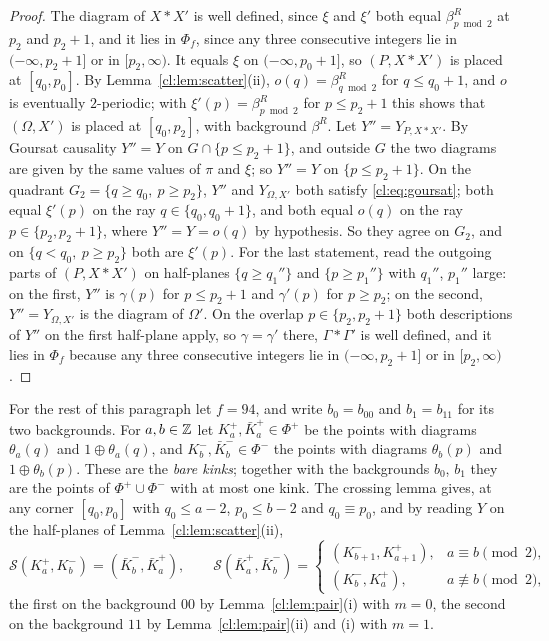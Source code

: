 \begin{proof}
The diagram of $X*X'$ is well defined, since $\xi$ and $\xi'$ both equal $\beta^R_{p\bmod2}$ at $p_2$ and $p_2+1$, and it lies in $\Phi_f$, since any three consecutive integers lie in $(-\infty,p_2+1]$ or in $[p_2,\infty)$. It equals $\xi$ on $(-\infty,p_0+1]$, so $(P,X*X')$ is placed at $[q_0,p_0]$. By Lemma~\ref{cl:lem:scatter}(ii), $o(q)=\beta^R_{q\bmod2}$ for $q\le q_0+1$, and $o$ is eventually $2$-periodic; with $\xi'(p)=\beta^R_{p\bmod2}$ for $p\le p_2+1$ this shows that $(\Omega,X')$ is placed at $[q_0,p_2]$, with background $\beta^R$. Let $Y''=Y_{P,X*X'}$. By Goursat causality $Y''=Y$ on $G\cap\{p\le p_2+1\}$, and outside $G$ the two diagrams are given by the same values of $\pi$ and $\xi$; so $Y''=Y$ on $\{p\le p_2+1\}$. On the quadrant $G_2=\{q\ge q_0,\ p\ge p_2\}$, $Y''$ and $Y_{\Omega,X'}$ both satisfy \eqref{cl:eq:goursat}; both equal $\xi'(p)$ on the ray $q\in\{q_0,q_0+1\}$, and both equal $o(q)$ on the ray $p\in\{p_2,p_2+1\}$, where $Y''=Y=o(q)$ by hypothesis. So they agree on $G_2$, and on $\{q<q_0,\ p\ge p_2\}$ both are $\xi'(p)$. For the last statement, read the outgoing parts of $(P,X*X')$ on half-planes $\{q\ge q_1''\}$ and $\{p\ge p_1''\}$ with $q_1''$, $p_1''$ large: on the first, $Y''$ is $\gamma(p)$ for $p\le p_2+1$ and $\gamma'(p)$ for $p\ge p_2$; on the second, $Y''=Y_{\Omega,X'}$ is the diagram of $\Omega'$. On the overlap $p\in\{p_2,p_2+1\}$ both descriptions of $Y''$ on the first half-plane apply, so $\gamma=\gamma'$ there, $\Gamma*\Gamma'$ is well defined, and it lies in $\Phi_f$ because any three consecutive integers lie in $(-\infty,p_2+1]$ or in $[p_2,\infty)$.
\end{proof}

For the rest of this paragraph let $f=94$, and write $b_0=b_{00}$ and $b_1=b_{11}$ for its two backgrounds. For $a,b\in\mathbb{Z}$ let $K^+_a,\bar K^+_a\in\Phi^+$ be the points with diagrams $\theta_a(q)$ and $1\oplus\theta_a(q)$, and $K^-_b,\bar K^-_b\in\Phi^-$ the points with diagrams $\theta_b(p)$ and $1\oplus\theta_b(p)$. These are the \emph{bare kinks}; together with the backgrounds $b_0$, $b_1$ they are the points of $\Phi^+\cup\Phi^-$ with at most one kink. The crossing lemma gives, at any corner $[q_0,p_0]$ with $q_0\le a-2$, $p_0\le b-2$ and $q_0\equiv p_0$, and by reading $Y$ on the half-planes of Lemma~\ref{cl:lem:scatter}(ii),
\begin{equation}\label{cl:eq:cross94}
\mathcal S(K^+_a,K^-_b)=(\bar K^-_b,\bar K^+_a),\qquad
\mathcal S(\bar K^+_a,\bar K^-_b)=\begin{cases}(K^-_{b+1},K^+_{a+1}),&a\equiv b\pmod2,\\(K^-_b,K^+_a),&a\not\equiv b\pmod2,\end{cases}
\end{equation}
the first on the background $00$ by Lemma~\ref{cl:lem:pair}(i) with $m=0$, the second on the background $11$ by Lemma~\ref{cl:lem:pair}(ii) and (i) with $m=1$.

